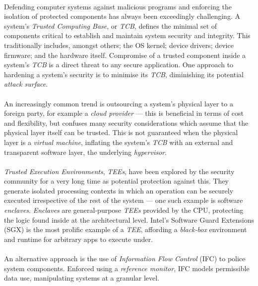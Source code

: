 


\paragraph{} Defending computer systems against malicious programs and enforcing the isolation of protected components has always been exceedingly challenging. A system's \textit{Trusted Computing Base}, or \textit{TCB}, defines the minimal set of components critical to establish and maintain system security and integrity. This traditionally includes, amongst others; the OS kernel; device drivers; device firmware; and the hardware itself. Compromise of a trusted component inside a system's \textit{TCB} is a direct threat to any secure application. One approach to hardening a system's security is to minimise its \textit{TCB}, diminishing its potential \textit{attack surface}. 

\paragraph{} An increasingly common trend is outsourcing a system's physical layer to a foreign party, for example a \textit{cloud provider} --- this is beneficial in terms of cost and flexibility, but confuses many security considerations which assume that the physical layer itself can be trusted. This is not guaranteed when the physical layer is a \textit{virtual machine}, inflating the system's \textit{TCB} with an external and transparent software layer, the underlying \textit{hypervisor}.

\paragraph{} \textit{Trusted Execution Environments}, \textit{TEEs}, have been explored by the security community for a very long time as potential protection against this. They generate isolated processing contexts in which an operation can be securely executed irrespective of the rest of the system --- one such example is software \textit{enclaves}. \textit{Enclaves} are general-purpose \textit{TEEs} provided by the CPU, protecting the logic found inside at the architectural level. Intel's Software Guard Extensions (SGX) is the most prolific example of a \textit{TEE}, affording a \textit{black-box} environment and runtime for arbitrary apps to execute under.

\paragraph{} An alternative approach is the use of \textit{Information Flow Control} (IFC) to police system components. Enforced using a \textit{reference monitor}, IFC models permissible data use, manipulating systems at a granular level.

